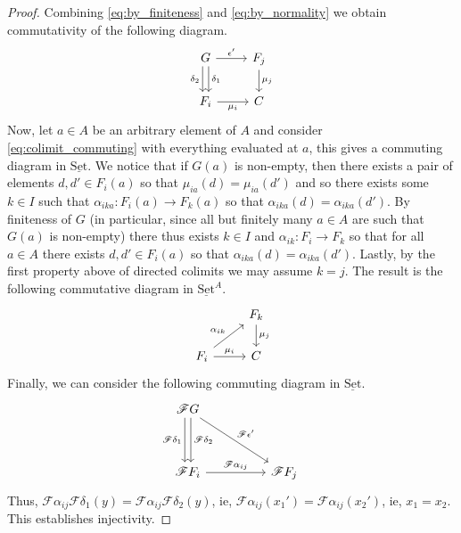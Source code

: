 \documentclass[12pt]{article}
\theoremstyle{plain}
\theoremstyle{definition}
\newcommand{\scr}[1]{\mathscr{#1}}
\newcommand{\lto}{\longrightarrow}
\newcommand{\set}{\operatorname{\underline{Set}}}
\begin{document}
\begin{proof}
		Combining \eqref{eq:by_finiteness} and \eqref{eq:by_normality} we obtain commutativity of the following diagram.
		\begin{equation}\label{eq:colimit_commuting}
			\begin{tikzcd}
				G\arrow[r,"{\epsilon'}"]\arrow[d,shift left,"{\delta_1}"]\arrow[d, swap, shift right, "{\delta_2}"] & F_j\arrow[d,"{\mu_j}"]\\
				F_i\arrow[r,swap,"{\mu_i}"] & C
				\end{tikzcd}
			\end{equation}
		Now, let $a \in A$ be an arbitrary element of $A$ and consider \eqref{eq:colimit_commuting} with everything evaluated at $a$, this gives a commuting diagram in $\set$. We notice that if $G(a)$ is non-empty, then there exists a pair of elements $d,d' \in F_i(a)$ so that $\mu_{ia}(d) = \mu_{ia}(d')$ and so there exists some $k \in I$ such that $\alpha_{ika}: F_{i}(a) \lto F_k(a)$ so that $\alpha_{ika}(d) = \alpha_{ika}(d')$. By finiteness of $G$ (in particular, since all but finitely many $a \in A$ are such that $G(a)$ is non-empty) there thus exists $k \in I$ and $\alpha_{ik}: F_i \lto F_k$ so that for all $a \in A$ there exists $d,d' \in F_i(a)$ so that $\alpha_{ika}(d) = \alpha_{ika}(d')$. Lastly, by the first property above of directed colimits we may assume $k = j$. The result is the following commutative diagram in $\set^A$.
		\begin{equation}
			\begin{tikzcd}
				& F_k\arrow[d,"{\mu_j}"]\\
				F_i\arrow[ur,"{\alpha_{ik}}"]\arrow[r,"{\mu_i}"] & C
				\end{tikzcd}
			\end{equation}
		Finally, we can consider the following commuting diagram in $\set$.
		\begin{equation}
			\begin{tikzcd}[column sep = huge, row sep = huge]
			\scr{F}G\arrow[dr,"{\scr{F}\epsilon'}"]\arrow[d,shift right, swap, "{\scr{F}\delta_1}"]\arrow[d,shift left, "{\scr{F}\delta_2}"]\\
			\scr{F}F_i\arrow[r,"{\scr{F}\alpha_{ij}}"]& \scr{F}F_j
			\end{tikzcd}
			\end{equation}
		Thus, $\scr{F}\alpha_{ij}\scr{F}\delta_1(y) = \scr{F}\alpha_{ij}\scr{F}\delta_2(y)$, ie, $\scr{F}\alpha_{ij}(x_1') = \scr{F}\alpha_{ij}(x_2')$, ie, $x_1 = x_2$. This establishes injectivity.
		

\end{proof}
\end{document}
